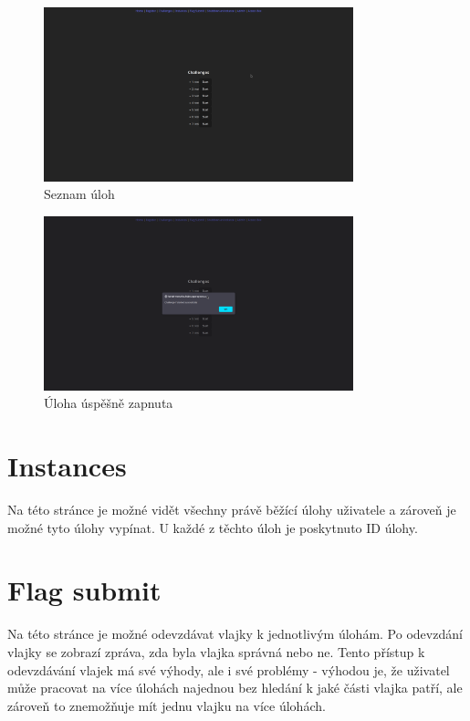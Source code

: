 \documentclass[12pt, a4paper,
oneside,      %
openright
]{report}
\begin{document}
\begin{figure}[h]
	\centering
	\includegraphics[width=0.8\textwidth]{02-challenges.png}
	\caption{Seznam úloh}
	\label{fig:frontend-challenges}
\end{figure}

\begin{figure}[h]
	\centering
	\includegraphics[width=0.8\textwidth]{03-challenges_success.png}
	\caption{Úloha úspěšně zapnuta}
	\label{fig:frontend-challenges-success}
\end{figure}

\section{Instances}
Na této stránce je možné vidět všechny právě běžící úlohy uživatele a zároveň je možné tyto úlohy vypínat. U každé z těchto úloh je poskytnuto ID úlohy.


\section{Flag submit}
Na této stránce je možné odevzdávat vlajky k jednotlivým úlohám. Po odevzdání vlajky se zobrazí zpráva, zda byla vlajka správná nebo ne. Tento přístup k odevzdávání vlajek má své výhody, ale i své problémy - výhodou je, že uživatel může pracovat na více úlohách najednou bez hledání k jaké části vlajka patří, ale zároveň to znemožňuje mít jednu vlajku na více úlohách.
\end{document}
